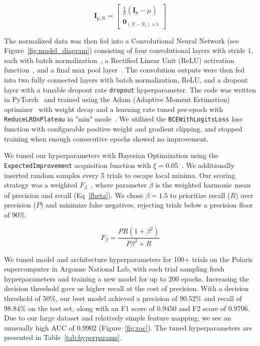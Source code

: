 \documentclass[twocolumn]{article}
\begin{document}
\begin{equation}
  \label{current_norm}
\mathbf{I}_{p,\mathrm{N}} =
\begin{bmatrix}
\frac{1}{\sigma}(\mathbf{I}_p - \mu)\\[0.5em]
  \mathbf{0}_{(N-N_i) \times 1}
\end{bmatrix}  
\end{equation}





The normalized data was then fed into a Convolutional Neural Network (see Figure~\ref{fig:model_diagram}) consisting of four convolutional layers with stride $1$, each with batch normalization~\cite{bn}, a Rectified Linear Unit (ReLU) activation function~\cite{relu}, and a final max pool layer~\cite{maxpool}. The convolution outputs were then fed into two fully connected layers with batch normalization, ReLU, and a dropout layer with a tunable dropout rate \verb|dropout| hyperparameter. The code was written in PyTorch~\cite{pytorch} and trained using the Adam (Adaptive Moment Estimation) optimizer~\cite{adam} with weight decay and a learning rate tuned per-epoch with \verb|ReduceLROnPlateau| in "min" mode~\cite{lr}. We utilized the \verb|BCEWithLogitsLoss| loss function with configurable positive weight and gradient clipping, and stopped training when enough consecutive epochs showed no improvement.

We tuned our hyperparameters with Bayesian Optimization using the \verb|ExpectedImprovement| acquisition function with $\xi=0.05$~\cite{bayes}. We additionally inserted random samples every 5 trials to escape local minima. Our scoring strategy was a weighted $F_\beta$~\cite{fbeta}, where parameter $\beta$ is the weighted harmonic mean of precision and recall (Eq~\eqref{fbeta}). We chose $\beta=1.5$ to prioritize recall ($R$) over precision ($P$) and minimize false negatives, rejecting trials below a precision floor of 90\%. 


\begin{equation}
  \label{fbeta}
  F_\beta =  \frac{PR(1 + \beta^2)}{P\beta^2+R}
\end{equation}

We tuned model and architecture hyperparameters for 100+ trials on the Polaris supercomputer in Argonne National Lab, with each trial sampling fresh hyperparameters and training a new model for up to 200 epochs. Increasing the decision threshold gave us higher recall at the cost of precision. With a decision threshold of 50\%, our best model achieved a precision of 90.52\% and recall of 98.84\% on the test set, along with an F1 score of $0.9450$ and F2 score of $0.9706$. Due to our large dataset and relatively simple feature mapping, we see an unusually high AUC of $0.9902$ (Figure~\ref{fig:roc}). The tuned hyperparameters are presented in Table~\ref{tab:hyperparams}. 
          
\end{document}
